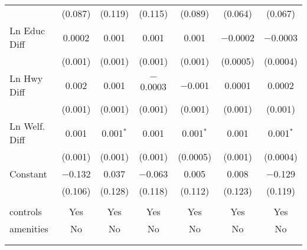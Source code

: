 \begin{table}[!htbp]
\begin{tabular}{@{\extracolsep{5pt}}lcccccc}
  & (0.087) & (0.119) & (0.115) & (0.089) & (0.064) & (0.067) \\ 
  Ln Educ Diff & 0.0002 & 0.001 & 0.001 & 0.001 & $-$0.0002 & $-$0.0003 \\ 
  & (0.001) & (0.001) & (0.001) & (0.001) & (0.0005) & (0.0004) \\ 
  Ln Hwy Diff & 0.002 & 0.001 & $-$0.0003 & $-$0.001 & 0.0001 & 0.0002 \\ 
  & (0.001) & (0.001) & (0.001) & (0.001) & (0.001) & (0.001) \\ 
  Ln Welf. Diff & 0.001 & 0.001$^{*}$ & 0.001 & 0.001$^{*}$ & 0.001 & 0.001$^{*}$ \\ 
  & (0.001) & (0.001) & (0.001) & (0.0005) & (0.001) & (0.0004) \\ 
  Constant & $-$0.132 & 0.037 & $-$0.063 & 0.005 & 0.008 & $-$0.129 \\ 
  & (0.106) & (0.128) & (0.118) & (0.112) & (0.123) & (0.119) \\ 
 \hline \\[-1.8ex] 
controls & Yes & Yes & Yes & Yes & Yes & Yes \\ 
amenities & No & No & No & No & No & No \\ 
\hline \\[-1.8ex] 
\hline 
\hline \\[-1.8ex] 
\end{tabular} 
\end{table} 
